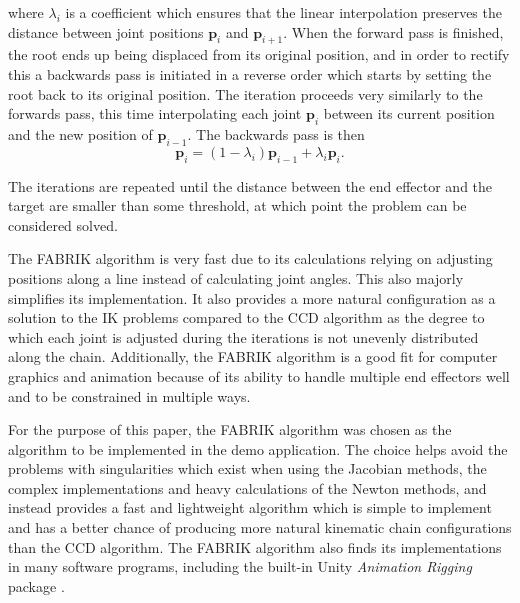 \noindent where \(\lambda_i\) is a coefficient which ensures that the linear interpolation
preserves the distance between joint positions \(\mathbf{p}_i\) and
\(\mathbf{p}_{i+1}\). When the forward pass is finished, the root ends up being
displaced from its original position, and in order to rectify this a backwards
pass is initiated in a reverse order which starts by setting the root back to
its original position. The iteration proceeds very similarly to the forwards
pass, this time interpolating each joint \(\mathbf{p}_i\) between its current
position and the new position of \(\mathbf{p}_{i-1}\). The backwards pass is then
\begin{equation}
    \mathbf{p}_i = (1 - \lambda_i)\mathbf{p}_{i-1} + \lambda_i \mathbf{p}_i.
\end{equation}

The iterations are repeated until the distance between the end effector and the
target are smaller than some threshold, at which point the problem can be
considered solved.

The FABRIK algorithm is very fast due to its calculations relying on adjusting
positions along a line instead of calculating joint angles. This also majorly
simplifies its implementation. It also provides a more natural configuration as
a solution to the IK problems compared to the CCD algorithm as the degree to
which each joint is adjusted during the iterations is not unevenly distributed
along the chain. Additionally, the FABRIK algorithm is a good fit for computer
graphics and animation because of its ability to handle multiple end effectors
well and to be constrained in multiple ways.

For the purpose of this paper, the FABRIK algorithm was chosen as the
algorithm to be implemented in the demo application. The choice helps avoid the
problems with singularities which exist when using the Jacobian methods, the
complex implementations and heavy calculations of the Newton methods, and
instead provides a fast and lightweight algorithm which is simple to implement
and has a better chance of producing more natural kinematic chain configurations
than the CCD algorithm. The FABRIK algorithm also finds its implementations in
many software programs, including the built-in Unity \textit{Animation Rigging}
package \cite{unity_animation_rigging}.

